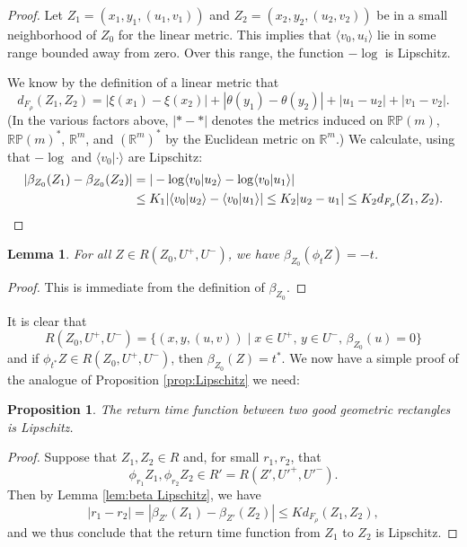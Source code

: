 \documentclass[10pt]{amsart}
\let\sep\mid
\newtheorem{lem}[thm]{Lemma}
\newtheorem{prop}[thm]{Proposition}
\theoremstyle{definition}
\numberwithin{equation}{section}
\begin{document}
\begin{proof}
Let $Z_1=(x_1,y_1,(u_1,v_1))$ and $Z_2=(x_2,y_2,(u_2,v_2))$ be in a small neighborhood of $Z_0$ for the linear metric. This implies that $\langle v_0,u_i\rangle$ lie in some range bounded away from zero. Over this range, the function $-\log$ is Lipschitz.

We know by the definition of a linear metric that\vspace*{-3pt}\enlargethispage{\baselineskip}%
\[ d_{F_\rho}(Z_1,Z_2) = |\xi(x_1)-\xi(x_2)| + |\theta(y_1)-\theta(y_2)| + |u_1-u_2| + |v_1-v_2|. \]
(In the various factors above, $|* - *|$ denotes the metrics induced on $\mathbb{RP}(m)$, $\mathbb{RP}(m)^*$, $\mathbb{R}^m$, and $(\mathbb{R}^m)^*$ by the Euclidean metric on $\mathbb{R}^m$.)
We calculate, using that $-\log$ and $\langle v_0 | \cdot\rangle$ are Lipschitz:\vspace*{-3pt}
\begin{align*}
|\beta_{Z_0}(Z_1)-\beta_{Z_0}(Z_2)| &= |-\log\langle v_0|u_2\rangle - \log\langle v_0|u_1\rangle |\\
& \leq K_1 |\langle v_0|u_2 \rangle - \langle v_0|u_1 \rangle| 
 \leq K_2 |u_2-u_1| \leq K_2 d_{F_\rho}(Z_1,Z_2). \qedhere
\end{align*}
\end{proof}

\begin{lem}
For all $Z\in R(Z_0,U^+,U^-)$, we have $\beta_{Z_0}(\phi_t Z) = -t$.
\end{lem}

\begin{proof}
This is immediate from the definition of $\beta_{Z_0}$.
\end{proof}

It is clear that\vspace*{-3pt}
\[
R(Z_0, U^+, U^-) = \{ (x,y,(u,v)) \sep x\in U^+,\, y\in U^-,\, \beta_{Z_0}(u)=0\}
\]
and if $\phi_{t^*}Z \in R(Z_0,U^+,U^-)$, then $\beta_{Z_0}(Z)=t^*$. We now have a simple proof of the analogue of Proposition \ref{prop:Lipschitz} we need:

\begin{prop}
The return time function between two good geometric rectangles is Lipschitz.
\end{prop}

\begin{proof}
Suppose that $Z_1, Z_2 \in R$ and, for small $r_1, r_2$, that\vspace*{-3pt}
\[
\phi_{r_1}Z_1, \phi_{r_2}Z_2 \in R'=R(Z',U'^+, U'^-).
\]
Then by Lemma \ref{lem:beta Lipschitz}, we have\vspace*{-4pt}
\[
|r_1-r_2| = |\beta_{Z'}(Z_1) - \beta_{Z'}(Z_2)| \leq K d_{F_\rho}(Z_1, Z_2),
\]
and we thus conclude that the return time function from $Z_1$ to $Z_2$ is Lipschitz.
\end{proof}
\end{document}
